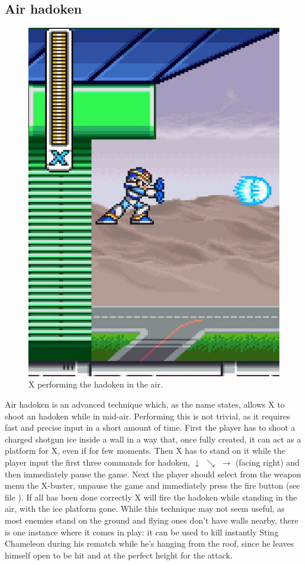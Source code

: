 \subsection{Air hadoken}
\begin{figure}[htp]
	\centering
	\includegraphics[width=0.4\linewidth]{figures/X1/Miscs/Flying_hadoken.jpg}
	\caption{X performing the hadoken in the air.}
\end{figure}
Air hadoken is an advanced technique which, as the name states, allows X to shoot an hadoken while in mid-air. Performing this is not trivial, as it requires fast and precise input in a short amount of time. First the player has to shoot a charged shotgun ice inside a wall in a way that, once fully created, it can act as a platform for X, even if for few moments. Then X has to stand on it while the player input the first three commands for hadoken, $\downarrow$ $\searrow$ $\rightarrow$ (facing right) and then immediately pause the game. Next the player should select from the weapon menu the X-buster, unpause the game and immediately press the fire button (see file ). If all has been done correctly X will fire the hadoken while standing in the air, with the ice platform gone. While this technique may not seem useful, as most enemies stand on the ground and flying ones don't have walls nearby, there is one instance where it comes in play: it can be used to kill instantly Sting Chameleon during his rematch while he's hanging from the roof, since he leaves himself open to be hit and at the perfect height for the attack.


